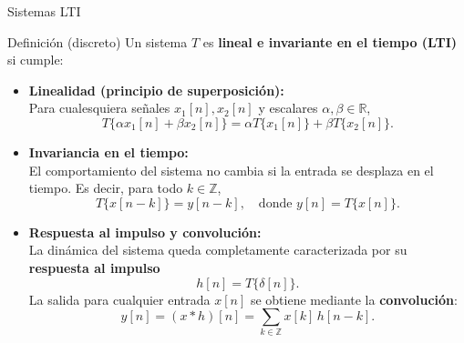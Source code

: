 \documentclass[
    10pt,
    aspectratio=169,
    xcolor={dvipsnames},
    spanish,
    ]{beamer}
\begin{document}
\begin{frame}{Sistemas LTI}
    \begin{block}{Definición (discreto)}
      \footnotesize
      Un sistema $T$ es \textbf{lineal e invariante en el tiempo (LTI)} si cumple:
      \begin{itemize}
        \item \textbf{Linealidad (principio de superposición):}\\
        Para cualesquiera señales $x_1[n], x_2[n]$ y escalares $\alpha, \beta \in \mathbb{R}$,
        \begin{equation*}
          T\{\alpha x_1[n] + \beta x_2[n]\} = \alpha T\{x_1[n]\} + \beta T\{x_2[n]\}.
        \end{equation*}

        \item \textbf{Invariancia en el tiempo:}\\
        El comportamiento del sistema no cambia si la entrada se desplaza en el tiempo. Es decir, para todo $k \in \mathbb{Z}$,
        \begin{equation*}
          T\{x[n-k]\} = y[n-k], \quad \text{donde } y[n] = T\{x[n]\}.
        \end{equation*}

        \item \textbf{Respuesta al impulso y convolución:}\\
        La dinámica del sistema queda completamente caracterizada por su \textbf{respuesta al impulso}
        \begin{equation*}
          h[n] = T\{\delta[n]\}.
        \end{equation*}
        La salida para cualquier entrada $x[n]$ se obtiene mediante la \textbf{convolución}:
        \begin{equation*}
          y[n] = (x * h)[n] = \sum_{k \in \mathbb{Z}} x[k]\, h[n-k].
        \end{equation*}
      \end{itemize}
    \end{block}
\end{frame}


\end{document}
